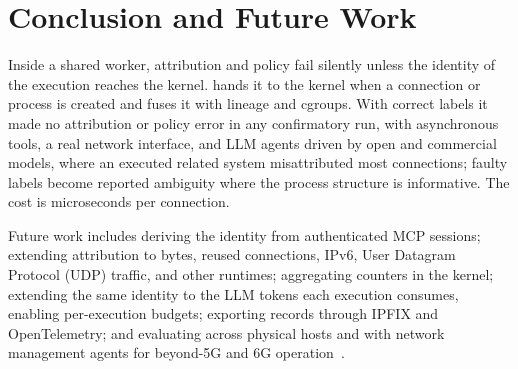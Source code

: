 \section{Conclusion and Future Work}
\label{sec:conclusion}

Inside a shared worker, attribution and policy fail silently unless the identity of the execution reaches the kernel. \solution{} hands it to the kernel when a connection or process is created and fuses it with lineage and cgroups. With correct labels it made no attribution or policy error in any confirmatory run, with asynchronous tools, a real network interface, and LLM agents driven by open and commercial models, where an executed related system misattributed most connections; faulty labels become reported ambiguity where the process structure is informative. The cost is microseconds per connection.

Future work includes deriving the identity from authenticated MCP sessions; extending attribution to bytes, reused connections, IPv6, User Datagram Protocol (UDP) traffic, and other runtimes; aggregating counters in the kernel; extending the same identity to the LLM tokens each execution consumes, enabling per-execution budgets; exporting records through IPFIX and OpenTelemetry; and evaluating \solution{} across physical hosts and with network management agents for beyond-5G and 6G operation~\cite{corici2025agents,xiao2025agentic}.

